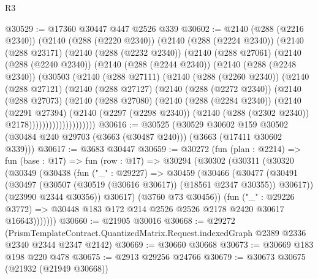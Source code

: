 \begin{lexlean}{R3}
\begin{coremodule}
@30529 := @17360 @30447 @447 @2526 @339
@30602 := @2140
    (@288 (@2216 @2340))
    (@2140
      (@288 (@2220 @2340))
      (@2140
        (@288 (@2224 @2340))
        (@2140
          (@288 @23171)
          (@2140
            (@288 (@2232 @2340))
            (@2140
              (@288 @27061)
              (@2140
                (@288 (@2240 @2340))
                (@2140
                  (@288 (@2244 @2340))
                  (@2140
                    (@288 (@2248 @2340))
                    (@30503
                      (@2140
                        (@288 @27111)
                        (@2140
                          (@288 (@2260 @2340))
                          (@2140
                            (@288 @27121)
                            (@2140
                              (@288 @27127)
                              (@2140
                                (@288 (@2272 @2340))
                                (@2140
                                  (@288 @27073)
                                  (@2140
                                    (@288 @27080)
                                    (@2140
                                      (@288 (@2284 @2340))
                                      (@2140
                                        (@2291 @27394)
                                        (@2140
                                          (@2297 (@2298 @2340))
                                          (@2140 (@288 (@2302 @2340)) @2178))))))))))))))))))))
@30616 := @30525
    (@30529
      @30602
      @159
      @30502
      (@30484 @240 @29703 (@3663 (@30487 @240)))
      (@3663 (@17411 @30602 @339)))
@30617 := @3683 @30447
@30659 := @30272
    (fun (plan : @2214) =>
    fun (base : @17) =>
    fun (row : @17) =>
    @30294
      (@30302
        (@30311
          (@30320
            (@30349
              (@30438
                (fun ("_" : @29227) =>
                @30459
                  (@30466
                    (@30477
                      (@30491
                        (@30497 (@30507 (@30519 (@30616 @30617)) (@18561 @2347 @30355)) @30617))
                      (@23990 @2344 @30356))
                    @30617)
                  (@3760 @73 @30456))
                (fun ("_" : @29226 @3772) =>
                @30448 @183 @172 @214 @2526 @2526 @2178 @2420 @30617 @16643)))))))
@30660 := @21905 @30016
@30668 := @29272
    (PrismTemplateContract.QuantizedMatrix.Request.indexedGraph @2389 @2336 @2340 @2344 @2347 @2142)
@30669 := @30660 @30668
@30673 := @30669 @183 @198 @220 @478
@30675 := @2913 @29256 @24766
@30679 := @30673 @30675 (@21932 (@21949 @30668))

\end{coremodule}
\end{lexlean}
